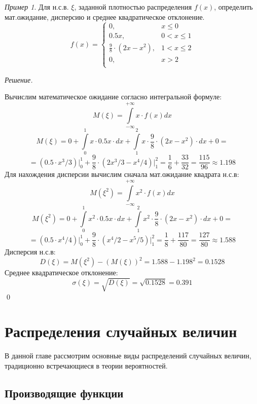 \documentclass[12pt,a4paper]{article}
\theoremstyle{definition}
\theoremstyle{definition}
\theoremstyle{remark}
\theoremstyle{corollary}
\newcommand{\nextblock}{\vspace{1.5em}\noindent}
\theoremstyle{bolditalic}
\newtheorem{example}{Пример}[section]
\newenvironment{solution}{
    \vspace{0.5em}
    \noindent\textit{Решение.}
}{\qed\vspace{1em}}
\begin{document}
\nextblock

\begin{example}
    Для н.с.в. $\xi$, заданной плотностью распределения $f(x)$, определить мат.ожидание, дисперсию и среднее квадратическое отклонение.
    \[
     f(x) = \begin{cases}
      0, & x \le 0 \\
      0.5x, & 0 < x \le  1\\
      \frac{9}{8}\cdot (2x-x^2), & 1 < x \le 2 \\
      0, & x > 2 \\
    \end{cases}
     \]
\end{example}
\begin{solution}
    Вычислим математическое ожидание согласно интегральной формуле:
    \[
    M(\xi) = \int\limits_{-\infty}^{+\infty}{x\cdot f(x)dx}
    \]
    \[
    M(\xi) = 0+\int\limits_{0}^{1}{x\cdot 0.5x\cdot dx}+\int\limits_{1}^{2}{x\cdot \frac{9}{8}\cdot (2x-x^2)\cdot dx}+0=
    \]
    \[
    = (0.5\cdot x^3/3)\Big|_{0}^{1} + \frac{9}{8}\cdot (2x^3/3-x^4/4)\Big|_{1}^{2}=\frac{1}{6}+\frac{33}{32}=\frac{115}{96} \approx 1.198
    \]
    Для нахождения дисперсии вычислим сначала мат.ожидание квадрата н.с.в:
    \[
    M(\xi^2) = \int\limits_{-\infty}^{+\infty}{x^2\cdot f(x)dx}
    \]
    \[
    M(\xi^2) = 0+\int\limits_{0}^{1}{x^2\cdot 0.5x\cdot dx}+\int\limits_{1}^{2}{x^2\cdot \frac{9}{8}\cdot (2x-x^2)\cdot dx}+0=
    \]
    \[
    = (0.5\cdot x^4/4)\Big|_{0}^{1} + \frac{9}{8}\cdot (x^4/2-x^5/5)\Big|_{1}^{2}=\frac{1}{8}+\frac{117}{80}=\frac{127}{80} \approx 1.588
    \]
    Дисперсия н.с.в:
    \[
    D(\xi)=M(\xi^2)-(M(\xi))^2=1.588-1.198^2=0.1528
    \]
    Среднее квадратическое отклонение:
    \[
    \sigma(\xi)=\sqrt{D(\xi)}=\sqrt{0.1528}=0.391
    \]
\end{solution}

\newpage

\section{Распределения случайных величин}

В данной главе рассмотрим основные виды распределений случайных величин, традиционно встречающиеся в теории вероятностей.

\subsection{Производящие функции}
\end{document}
